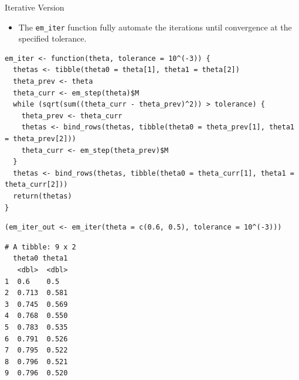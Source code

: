 \documentclass[dvipdfmx,bigger,aspectratio=169]{beamer}
\begin{document}
\begin{frame}[fragile,allowframebreaks,label=,t]{Iterative Version}
 \begin{itemize}
\item The \texttt{em\_iter} function fully automate the iterations until convergence at the specified tolerance.
\end{itemize}
\scriptsize
\begin{verbatim}
em_iter <- function(theta, tolerance = 10^(-3)) {
  thetas <- tibble(theta0 = theta[1], theta1 = theta[2])
  theta_prev <- theta
  theta_curr <- em_step(theta)$M
  while (sqrt(sum((theta_curr - theta_prev)^2)) > tolerance) {
    theta_prev <- theta_curr
    thetas <- bind_rows(thetas, tibble(theta0 = theta_prev[1], theta1 = theta_prev[2]))
    theta_curr <- em_step(theta_prev)$M
  }
  thetas <- bind_rows(thetas, tibble(theta0 = theta_curr[1], theta1 = theta_curr[2]))
  return(thetas)
}
\end{verbatim}

\normalsize

\newpage
\scriptsize
\begin{verbatim}
(em_iter_out <- em_iter(theta = c(0.6, 0.5), tolerance = 10^(-3)))
\end{verbatim}

\begin{verbatim}
# A tibble: 9 x 2
  theta0 theta1
   <dbl>  <dbl>
1  0.6    0.5  
2  0.713  0.581
3  0.745  0.569
4  0.768  0.550
5  0.783  0.535
6  0.791  0.526
7  0.795  0.522
8  0.796  0.521
9  0.796  0.520
\end{verbatim}

\normalsize
\end{frame}
\end{document}
